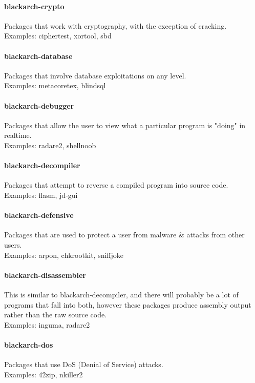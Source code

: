 \documentclass[a4paper, oneside,12pt]{scrartcl}
\begin{document}
\paragraph{blackarch-crypto}
Packages that work with cryptography, with the exception of cracking.
\\
Examples: ciphertest, xortool, sbd

\paragraph{blackarch-database}
Packages that involve database exploitations on any level.
\\
Examples: metacoretex, blindsql

\paragraph{blackarch-debugger}
Packages that allow the user to view what a particular program is "doing" in realtime.
\\
Examples: radare2, shellnoob

\paragraph{blackarch-decompiler}
Packages that attempt to reverse a compiled program into source code.
\\
Examples: flasm, jd-gui

\paragraph{blackarch-defensive}
Packages that are used to protect a user from malware \& attacks from other users.
\\
Examples: arpon, chkrootkit, sniffjoke

\paragraph{blackarch-disassembler}
This is similar to blackarch-decompiler, and there will probably be a lot
of programs that fall into both, however these packages produce assembly output
rather than the raw source code.
\\
Examples: inguma, radare2

\paragraph{blackarch-dos}
Packages that use DoS (Denial of Service) attacks.
\\
Examples: 42zip, nkiller2
\end{document}
